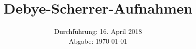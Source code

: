 

\subject{V41}
\title{Debye-Scherrer-Aufnahmen}
\date{%
  Durchführung: 16. April 2018
  \\
  Abgabe: \today
}



\maketitle
\thispagestyle{empty}
\tableofcontents
\newpage






\printbibliography{}


